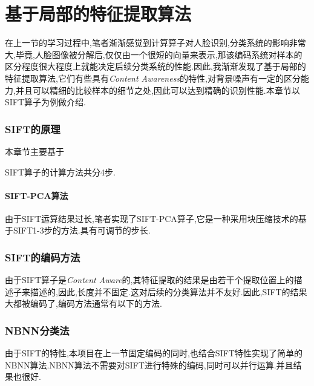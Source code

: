 \chapter{基于局部的特征提取算法}
在上一节的学习过程中,笔者渐渐感觉到计算算子对人脸识别,分类系统的影响非常大,毕竟,人脸图像被分解后,仅仅由一个很短的向量来表示,那该编码系统对样本的区分程度很大程度上就能决定后续分类系统的性能.因此,我渐渐发现了基于局部的特征提取算法,它们有些具有\textit{Content Awareness}的特性,对背景噪声有一定的区分能力,并且可以精细的比较样本的细节之处,因此可以达到精确的识别性能.本章节以SIFT算子为例做介绍.
\subsection{SIFT的原理}
本章节主要基于\cite{lowe2004distinctive, issolah2013sift, juan2009comparison, siftopencv, siftvlfeat, siftubc,lowe1999object}\newline

SIFT算子的计算方法共分4步.

\subsubsection{SIFT-PCA算法}
由于SIFT运算结果过长,笔者实现了SIFT-PCA算子\cite{ke2004pca},它是一种采用块压缩技术的基于SIFT1-3步的方法.具有可调节的步长.

\subsection{SIFT的编码方法}
由于SIFT算子是\textit{Content Aware}的,其特征提取的结果是由若干个提取位置上的描述子来描述的,因此,长度并不固定.这对后续的分类算法并不友好.因此,SIFT的结果大都被编码了,编码方法通常有以下的方法.\cite{chatfield2011devil}

\subsection{NBNN分类法}
由于SIFT的特性,本项目在上一节固定编码的同时,也结合SIFT特性实现了简单的NBNN算法.NBNN算法不需要对SIFT进行特殊的编码,同时可以并行运算.并且结果也很好.